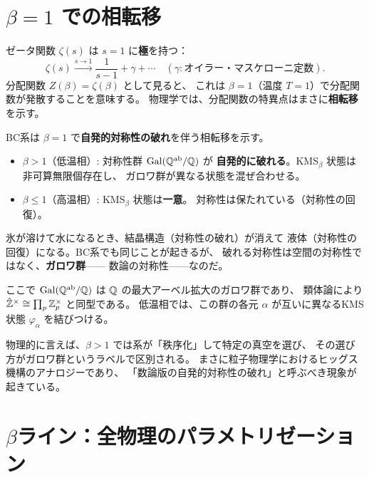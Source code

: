 \section{$\beta = 1$ での相転移}
\label{sec:2.4}

ゼータ関数 $\zeta(s)$ は $s=1$ に\textbf{極}を持つ：
\[
  \zeta(s) \xrightarrow{s\to 1} \frac{1}{s-1} + \gamma + \cdots
  \quad (\gamma: \text{オイラー・マスケローニ定数}).
\]
分配関数 $Z(\beta) = \zeta(\beta)$ として見ると、
これは $\beta = 1$（温度 $T=1$）で分配関数が発散することを意味する。
物理学では、分配関数の特異点はまさに\textbf{相転移}を示す。

\begin{keybox}[$\beta = 1$ での相転移 (Bost--Connes)]
BC系は $\beta = 1$ で\textbf{自発的対称性の破れ}を伴う相転移を示す。
\begin{itemize}
  \item $\beta > 1$（低温相）: 対称性群 $\operatorname{Gal}(\mathbb{Q}^{\mathrm{ab}}/\mathbb{Q})$ が
        \textbf{自発的に破れる}。KMS$_\beta$ 状態は非可算無限個存在し、
        ガロワ群が異なる状態を混ぜ合わせる。
  \item $\beta \leq 1$（高温相）: KMS$_\beta$ 状態は\textbf{一意}。
        対称性は保たれている（対称性の回復）。
\end{itemize}
\end{keybox}

\begin{hsbox}
氷が溶けて水になるとき、結晶構造（対称性の破れ）が消えて
液体（対称性の回復）になる。BC系でも同じことが起きるが、
破れる対称性は空間の対称性ではなく、\textbf{ガロワ群}——
数論の対称性——なのだ。
\end{hsbox}

ここで $\operatorname{Gal}(\mathbb{Q}^{\mathrm{ab}}/\mathbb{Q})$ は $\mathbb{Q}$ の最大アーベル拡大のガロワ群であり、
類体論により $\hat{\mathbb{Z}}^{\times} \cong \prod_p \mathbb{Z}_p^{\times}$ と同型である。
低温相では、この群の各元 $\alpha$ が互いに異なるKMS状態 $\varphi_\alpha$ を結びつける。

物理的に言えば、$\beta > 1$ では系が「秩序化」して特定の真空を選び、
その選び方がガロワ群というラベルで区別される。
まさに粒子物理学におけるヒッグス機構のアナロジーであり、
「数論版の自発的対称性の破れ」と呼ぶべき現象が起きている。

\section{$\beta$ライン：全物理のパラメトリゼーション}
\label{sec:2.5}

